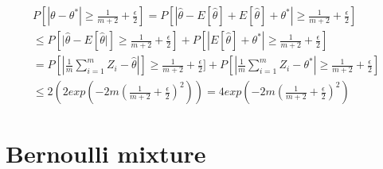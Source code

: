 \documentclass{article}
\begin{document}
\begin{equation}
\begin{split}
P[|\theta - \theta^*| \geq \frac{1}{m+2} + \frac{\epsilon}{2}] = P[|\hat{\theta} - E[\hat{\theta}] +E[\hat{\theta}]  + \theta^*| \geq \frac{1}{m+2} + \frac{\epsilon}{2}] \\
\leq P[|\hat{\theta} - E[\hat{\theta}|] \geq \frac{1}{m+2} + \frac{\epsilon}{2}] + P[|E[\hat{\theta}]  + \theta^*| \geq \frac{1}{m+2} + \frac{\epsilon}{2}] \\
= P[| \frac{1}{m}\sum_{i=1}^{m}Z_i- \hat{\theta} |] \geq \frac{1}{m+2} + \frac{\epsilon}{2}] + P[| \frac{1}{m}\sum_{i=1}^{m}Z_i- \theta^* | \geq \frac{1}{m+2} + \frac{\epsilon}{2}] \\
\leq 2(2exp(-2m(\frac{1}{m+2} + \frac{\epsilon}{2})^2)) = 4exp(-2m(\frac{1}{m+2} + \frac{\epsilon}{2})^2)
\end{split}
\end{equation}

\section{Bernoulli mixture}
\end{document}
